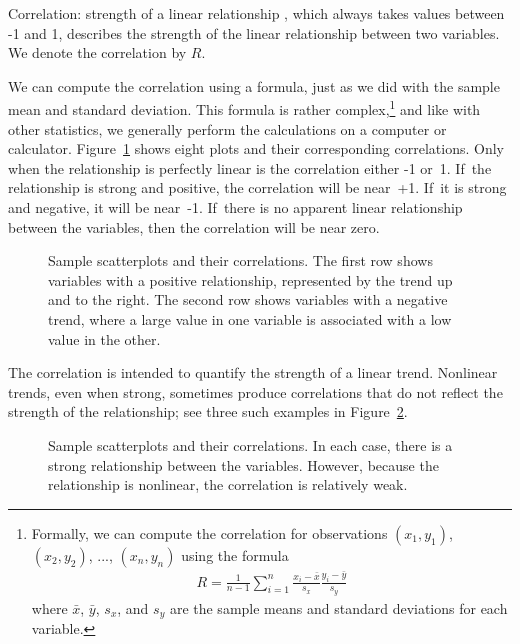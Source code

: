 \begin{onebox}{Correlation: strength of a linear relationship}
  , which always takes values
  between -1 and 1, describes the strength of the linear
  relationship between two variables.
  We denote the correlation by $R$.
\end{onebox}

We can compute the correlation using a formula, just as we did
with the sample mean and standard deviation.
This formula is rather complex,\footnote{Formally,
  we can compute the correlation for observations $(x_1, y_1)$,
  $(x_2, y_2)$, ..., $(x_n, y_n)$ using the formula
  \begin{align*}
  R = \frac{1}{n-1}
      \sum_{i=1}^{n} \frac{x_i-\bar{x}}{s_x}\frac{y_i-\bar{y}}{s_y}
  \end{align*}
  where $\bar{x}$, $\bar{y}$, $s_x$, and $s_y$ are the sample
  means and standard deviations for each variable.}
and like with other statistics, we generally perform the
calculations on a computer or calculator.
Figure~\ref{posNegCorPlots} shows eight plots and their
corresponding correlations.
Only when the relationship is perfectly linear is the
correlation either -1 or~1.
If~the relationship is strong and positive, the correlation
will be near~+1.
If~it is strong and negative, it will be near~-1.
If~there is no apparent linear relationship between the
variables, then the correlation will be near zero.

\begin{figure}
   \centering
   \caption{Sample scatterplots and their correlations.
       The first row shows variables with a positive
       relationship, represented by the trend up and to
       the right.
       The second row shows variables with a negative trend,
       where a large value in one variable is associated with
       a low value in the other.}
   \label{posNegCorPlots}
\end{figure}

The correlation is intended to quantify the strength of a linear trend. Nonlinear trends, even when strong, sometimes produce correlations that do not reflect the strength of the relationship; see three such examples in Figure~\ref{corForNonLinearPlots}.

\begin{figure}[h]
   \centering
   \caption{Sample scatterplots and their correlations.
       In each case, there is a strong relationship between
       the variables.
       However, because the relationship is nonlinear,
       the correlation is relatively weak.}
   \label{corForNonLinearPlots}
\end{figure}

